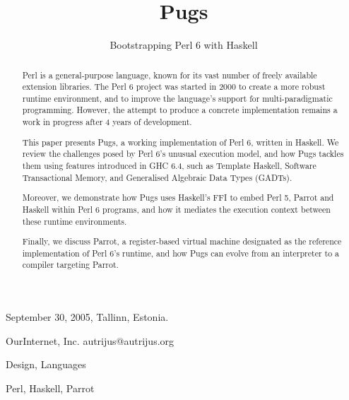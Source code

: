\documentclass[]{sigplanconf}
\begin{document}
 {September 30, 2005, Tallinn, Estonia.}




\title{Pugs}
\subtitle{Bootstrapping Perl 6 with Haskell}
           {OurInternet, Inc.}
           {autrijus@autrijus.org}
\maketitle

\begin{abstract}
  
Perl is a general-purpose language, known for its vast number of freely
available extension libraries.  The Perl 6 project was started in 2000
to create a more robust runtime environment, and to improve the language's
support for multi-paradigmatic programming.  However, the attempt to produce a
concrete implementation remains a work in progress after 4 years of development.

This paper presents Pugs, a working implementation of Perl 6, written in
Haskell.  We review the challenges posed by Perl 6's unusual execution model,
and how Pugs tackles them using features introduced in GHC 6.4, such as
Template Haskell, Software Transactional Memory, and Generalised Algebraic
Data Types (GADTs).

Moreover, we demonstrate how Pugs uses Haskell's FFI to embed Perl 5, Parrot
and Haskell within Perl 6 programs, and how it mediates the execution context
between these runtime environments.

Finally, we discuss Parrot, a register-based virtual machine designated as the
reference implementation of Perl 6's runtime, and how Pugs can evolve from an
interpreter to a compiler targeting Parrot.

\end{abstract}


\terms{}

Design, Languages

\keywords{}

Perl, Haskell, Parrot

\end{document}
